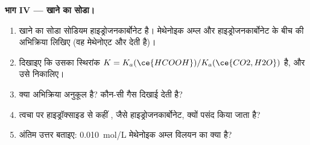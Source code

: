 \begin{problem}
\medskip
\noindent\textbf{भाग IV --- खाने का सोडा।}
\begin{enumerate}[resume]
  \item खाने का सोडा सोडियम हाइड्रोजनकार्बोनेट है। मेथेनोइक अम्ल और हाइड्रोजनकार्बोनेट
         के बीच की अभिक्रिया लिखिए (वह
        मेथेनोएट और  देती है)।
  \item दिखाइए कि उसका स्थिरांक $K = K_a(\ce{HCOOH}) / K_a(\ce{CO2,H2O})$ है,
        और उसे निकालिए।
  \item क्या अभिक्रिया अनुकूल है? कौन-सी गैस दिखाई देती है?
  \item त्वचा पर हाइड्रॉक्साइड से कहीं , जैसे हाइड्रोजनकार्बोनेट,
        क्यों पसंद किया जाता है?
  \item अंतिम उत्तर बताइए: \qty{0.010}{mol/L} मेथेनोइक अम्ल
        विलयन का  क्या है?
\end{enumerate}
\end{problem}
